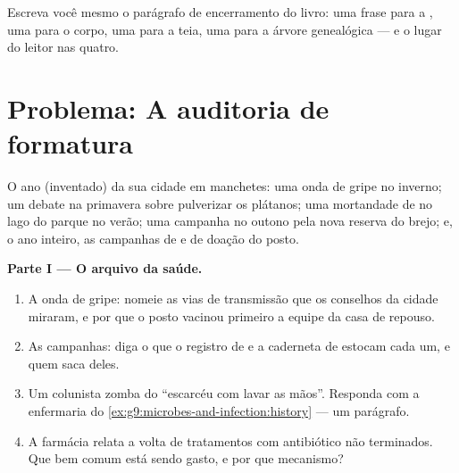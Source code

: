 \begin{exercise}[$\star\star\star$]\label{exo:g9:our-responsibility:12}
Escreva você mesmo o parágrafo de encerramento do livro: uma
frase para a , uma para o corpo, uma para a teia, uma
para a árvore genealógica --- e o lugar do leitor nas quatro.
\end{exercise}

\section{Problema: A auditoria de formatura}

\begin{problem}\label{pb:g9:our-responsibility:1}
O ano (inventado) da sua cidade em manchetes: uma onda de
gripe no inverno; um debate na primavera sobre pulverizar os
plátanos; uma mortandade de  no lago do parque no
verão; uma campanha no outono pela nova reserva do brejo; e,
o ano inteiro, as campanhas de  e de doação do
posto.

\medskip\noindent\textbf{Parte I --- O arquivo da saúde.}
\begin{enumerate}
  \item A onda de gripe: nomeie as vias de transmissão que os
        conselhos da cidade miraram, e por que o posto
        vacinou primeiro a equipe da casa de repouso.
  \item As campanhas: diga o que o registro de  e a
        caderneta de  estocam cada um, e quem saca
        deles.
  \item Um colunista zomba do ``escarcéu com lavar as mãos''.
        Responda com a enfermaria do
        \cref{ex:g9:microbes-and-infection:history} --- um
        parágrafo.
  \item A farmácia relata a volta de tratamentos com
        antibiótico não terminados. Que bem comum está sendo
        gasto, e por que mecanismo?
\end{enumerate}


\end{problem}
